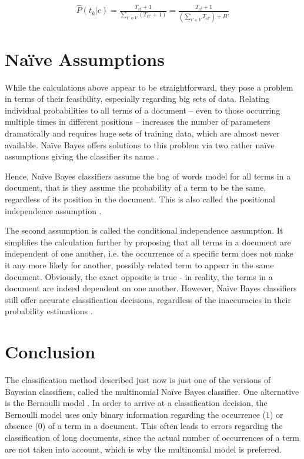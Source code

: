 \begin{gather}
    \hat{P}(t_{k}|c)    = \frac{T_{ct} + 1}{\sum_{t' \in V} (T_{ct'} + 1)}
                        = \frac{T_{ct} + 1}{(\sum_{t' \in V} T_{ct'}) + B'} \label{eq:laplace}
\end{gather}

\section{Na\"ive Assumptions} \label{sec:naive}

While the calculations above appear to be straightforward, they pose a problem in terms of their feasibility, especially regarding big sets of data. Relating individual probabilities to all terms of a document – even to those occurring multiple times in different positions – increases the number of parameters dramatically and requires huge sets of training data, which are almost never available. Naïve Bayes offers solutions to this problem via two rather na\"ive assumptions giving the classifier its name \citep{Manning2009, martin2018speech}. 

Hence, Na\"ive Bayes classifiers assume the bag of words model for all terms in a document, that is they assume the probability of a term to be the same, regardless of its position in the document. This is also called the positional independence assumption \citep{Manning2009, martin2018speech}.

The second assumption is called the conditional independence assumption. It simplifies the calculation further by proposing that all terms in a document are independent of one another, i.e. the occurrence of a specific term does not make it any more likely for another, possibly related term to appear in the same document. Obviously, the exact opposite is true - in reality, the terms in a document are indeed dependent on one another. However, Na\"ive Bayes classifiers still offer accurate classification decisions, regardless of the inaccuracies in their probability estimations \citep{Manning2009, martin2018speech}.  

\section{Conclusion}

The classification method described just now is just one of the versions of Bayesian classifiers, called the multinomial Na\"ive Bayes classifier. One alternative is the Bernoulli model \citep{Manning2009}. In order to arrive at a classification decision, the Bernoulli model uses only binary information regarding the occurrence ($1$) or absence ($0$) of a term in a document. This often leads to errors regarding the classification of long documents, since the actual number of occurrences of a term are not taken into account, which is why the multinomial model is preferred.

